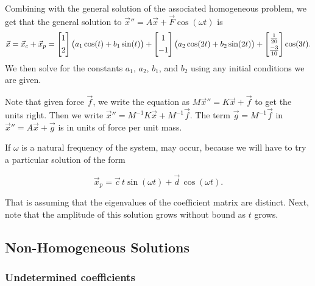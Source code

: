 \documentclass{ximera}
\begin{document}
\begin{exampleSol}
    Combining with the general solution of the associated homogeneous problem, we get that the general solution to ${\vec{x}}'' = A \vec{x} + \vec{F} \cos (\omega t)$ is
    \begin{equation*}
        \vec{x} = \vec{x}_c + \vec{x}_p =
        \begin{bmatrix} 
            1 \\
            \noalign{\smallskip}
            2 
        \end{bmatrix}
        \bigl( a_1 \cos (t) + b_1 \sin (t) \bigr) +
        \begin{bmatrix} 
            1 \\
            \noalign{\smallskip}
            -1 
        \end{bmatrix}
        \bigl( a_2 \cos (2t) + b_2 \sin (2t) \bigr) +
        \begin{bmatrix}
            \frac{1}{20} \\
            \noalign{\smallskip}
            \frac{-3}{10}
        \end{bmatrix}
        \cos (3t) .
    \end{equation*}
    We then solve for the constants $a_1$, $a_2$, $b_1$, and $b_2$ using any initial conditions we are given.
\end{exampleSol}

Note that given force $\vec{f}$, we write the equation as $M {\vec{x}}'' = K \vec{x} + \vec{f}$ to get the units right. Then we write ${\vec{x}}'' = M^{-1}K \vec{x} + M^{-1}\vec{f}$. The term $\vec{g} = M^{-1} \vec{f}$ in ${\vec{x}}'' = A \vec{x} + \vec{g}$ is in units of force per unit mass.

If $\omega$ is a natural frequency of the system, \emph{} may occur, because we will have to try a particular solution of the form

\begin{equation*}
    \vec{x}_p = \vec{c} \, t \sin (\omega t) + \vec{d} \, \cos (\omega t) .
\end{equation*}

That is assuming that the eigenvalues of the coefficient matrix are distinct. Next, note that the amplitude of this solution grows without bound as $t$ grows.

\subsection{Non-Homogeneous Solutions}

\subsubsection{Undetermined coefficients}
\end{document}
